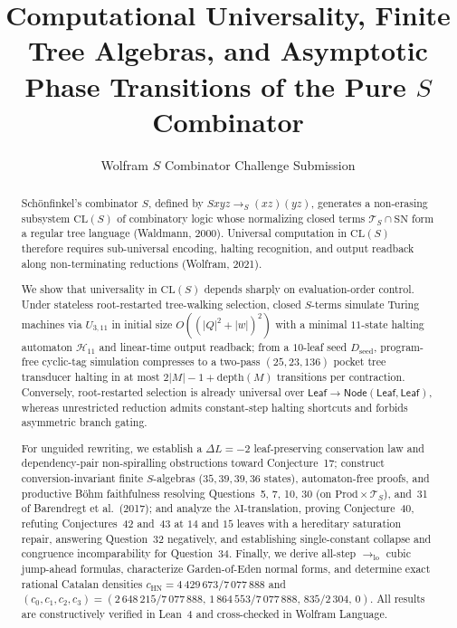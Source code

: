\documentclass[11pt,reqno]{amsart}
\title[Universality, Finite Algebras, and Asymptotics of Pure $S$]{Computational Universality, Finite Tree Algebras, and Asymptotic Phase Transitions of the Pure $S$ Combinator}
\author{Wolfram $S$ Combinator Challenge Submission}
\numberwithin{equation}{section}
\theoremstyle{plain}
\theoremstyle{definition}
\theoremstyle{remark}
\newcommand{\CLS}{\mathrm{CL}(S)}
\newcommand{\TS}{\mathcal{T}_S}
\newcommand{\SN}{\mathrm{SN}}
\newcommand{\HN}{\mathrm{HN}}
\newcommand{\Prod}{\mathrm{Prod}}
\newcommand{\redS}{\to_S}
\begin{document}
\begin{abstract}
Sch\"onfinkel's combinator $S$, defined by $S x y z \redS (x z)(y z)$, generates a non-erasing subsystem $\CLS$ of combinatory logic whose normalizing closed terms $\TS \cap \SN$ form a regular tree language (Waldmann, 2000). Universal computation in $\CLS$ therefore requires sub-universal encoding, halting recognition, and output readback along non-terminating reductions (Wolfram, 2021).

We show that universality in $\CLS$ depends sharply on evaluation-order control. Under stateless root-restarted tree-walking selection, closed $S$-terms simulate Turing machines via $U_{3,11}$ in initial size $O((|Q|^2 + |w|)^2)$ with a minimal $11$-state halting automaton $\mathcal{H}_{11}$ and linear-time output readback; from a $10$-leaf seed $D_{\mathrm{seed}}$, program-free cyclic-tag simulation compresses to a two-pass $(25, 23, 136)$ pocket tree transducer halting in at most $2|M| - 1 + \mathrm{depth}(M)$ transitions per contraction. Conversely, root-restarted selection is already universal over $\mathsf{Leaf} \to \mathsf{Node}(\mathsf{Leaf},\mathsf{Leaf})$, whereas unrestricted reduction admits constant-step halting shortcuts and forbids asymmetric branch gating.

For unguided rewriting, we establish a $\Delta L = -2$ leaf-preserving conservation law and dependency-pair non-spiralling obstructions toward Conjecture~17; construct conversion-invariant finite $S$-algebras ($35, 39, 39, 36$ states), automaton-free proofs, and productive B\"ohm faithfulness resolving Questions~5, 7, 10, 30 (on $\Prod \times \TS$), and~31 of Barendregt et al.\ (2017); and analyze the $\lambda\mathrm{I}$-translation, proving Conjecture~40, refuting Conjectures~42 and~43 at $14$ and $15$ leaves with a hereditary saturation repair, answering Question~32 negatively, and establishing single-constant collapse and congruence incomparability for Question~34. Finally, we derive all-step $\to_{\mathrm{lo}}$ cubic jump-ahead formulas, characterize Garden-of-Eden normal forms, and determine exact rational Catalan densities $c_{\HN} = 4\,429\,673/7\,077\,888$ and $(c_0, c_1, c_2, c_3) = (2\,648\,215/7\,077\,888,\, 1\,864\,553/7\,077\,888,\, 835/2\,304,\, 0)$. All results are constructively verified in Lean~4 and cross-checked in Wolfram Language.
\end{abstract}

\maketitle
\end{document}

